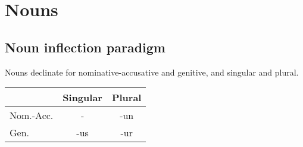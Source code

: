 \section{Nouns}

\subsection{Noun inflection paradigm}

Nouns declinate for nominative-accusative and genitive, and singular and plural.

\begin{center}
\begin{tabular}{l|cc}
          & Singular & Plural \\
\hline
Nom.-Acc. & -        & -un    \\
Gen.      & -us      & -ur    \\
\end{tabular}
\end{center}
